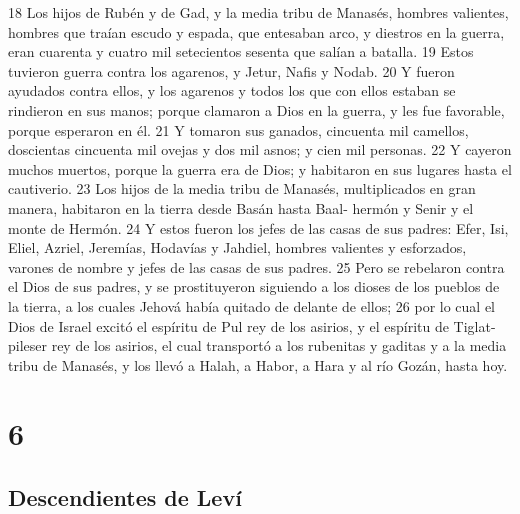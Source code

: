 18 Los hijos de Rubén y de Gad, y la media tribu de Manasés, hombres valientes, hombres que traían escudo y espada, que entesaban arco, y diestros en la guerra, eran cuarenta y cuatro mil setecientos sesenta que salían a batalla.
19 Estos tuvieron guerra contra los agarenos, y Jetur, Nafis y Nodab.
20 Y fueron ayudados contra ellos, y los agarenos y todos los que con ellos estaban se rindieron en sus manos; porque clamaron a Dios en la guerra, y les fue favorable, porque esperaron en él.
21 Y tomaron sus ganados, cincuenta mil camellos, doscientas cincuenta mil ovejas y dos mil asnos; y cien mil personas.
22 Y cayeron muchos muertos, porque la guerra era de Dios; y habitaron en sus lugares hasta el cautiverio.
23 Los hijos de la media tribu de Manasés, multiplicados en gran manera, habitaron en la tierra desde Basán hasta Baal- hermón y Senir y el monte de Hermón.
24 Y estos fueron los jefes de las casas de sus padres: Efer, Isi, Eliel, Azriel, Jeremías, Hodavías y Jahdiel, hombres valientes y esforzados, varones de nombre y jefes de las casas de sus padres.
25 Pero se rebelaron contra el Dios de sus padres, y se prostituyeron siguiendo a los dioses de los pueblos de la tierra, a los cuales Jehová había quitado de delante de ellos;
26 por lo cual el Dios de Israel excitó el espíritu de Pul rey de los asirios, y el espíritu de Tiglat-pileser rey de los asirios, el cual transportó a los rubenitas y gaditas y a la media tribu de Manasés, y los llevó a Halah, a Habor, a Hara y al río Gozán, hasta hoy. 

\chapter{6}

\section*{Descendientes de Leví}


